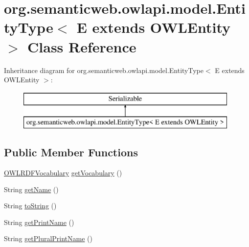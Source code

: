 \hypertarget{classorg_1_1semanticweb_1_1owlapi_1_1model_1_1_entity_type_3_01_e_01extends_01_o_w_l_entity_01_4}{\section{org.\-semanticweb.\-owlapi.\-model.\-Entity\-Type$<$ E extends O\-W\-L\-Entity $>$ Class Reference}
\label{classorg_1_1semanticweb_1_1owlapi_1_1model_1_1_entity_type_3_01_e_01extends_01_o_w_l_entity_01_4}
}
Inheritance diagram for org.\-semanticweb.\-owlapi.\-model.\-Entity\-Type$<$ E extends O\-W\-L\-Entity $>$\-:\begin{figure}[H]
\begin{center}
\leavevmode
\includegraphics[height=2.000000cm]{classorg_1_1semanticweb_1_1owlapi_1_1model_1_1_entity_type_3_01_e_01extends_01_o_w_l_entity_01_4}
\end{center}
\end{figure}
\subsection*{Public Member Functions}
\begin{DoxyCompactItemize}
\item 
\hyperlink{enumorg_1_1semanticweb_1_1owlapi_1_1vocab_1_1_o_w_l_r_d_f_vocabulary}{O\-W\-L\-R\-D\-F\-Vocabulary} \hyperlink{classorg_1_1semanticweb_1_1owlapi_1_1model_1_1_entity_type_3_01_e_01extends_01_o_w_l_entity_01_4_a880b09083f8a86ea7dc657c15f1fd545}{get\-Vocabulary} ()
\item 
String \hyperlink{classorg_1_1semanticweb_1_1owlapi_1_1model_1_1_entity_type_3_01_e_01extends_01_o_w_l_entity_01_4_a0be0d15dfa1d8c923881b7310a3669fa}{get\-Name} ()
\item 
String \hyperlink{classorg_1_1semanticweb_1_1owlapi_1_1model_1_1_entity_type_3_01_e_01extends_01_o_w_l_entity_01_4_a9515b130a48f7d7fc9b7ba822e6b6b4f}{to\-String} ()
\item 
String \hyperlink{classorg_1_1semanticweb_1_1owlapi_1_1model_1_1_entity_type_3_01_e_01extends_01_o_w_l_entity_01_4_a47e33328634041f43f5134db69b8f728}{get\-Print\-Name} ()
\item 
String \hyperlink{classorg_1_1semanticweb_1_1owlapi_1_1model_1_1_entity_type_3_01_e_01extends_01_o_w_l_entity_01_4_a10df4f9d851a109584d442fb421f6a4a}{get\-Plural\-Print\-Name} ()
\end{DoxyCompactItemize}
